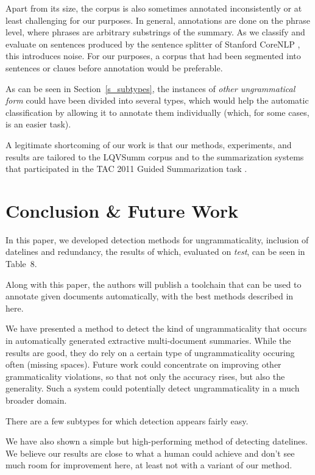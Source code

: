 \documentclass[a4paper,10pt]{scrartcl}
\theoremstyle{style}
\begin{document}
Apart from its size, the corpus is also sometimes annotated inconsistently or at least challenging for our purposes. In general, annotations are done on the phrase level, where phrases are arbitrary substrings of the summary. As we classify and evaluate on sentences produced by the sentence splitter of Stanford CoreNLP \citep{manning-EtAl:2014:P14-5}, this introduces noise. For our purposes, a corpus that had been segmented into sentences or claues before annotation would be preferable.

As can be seen in Section~\ref{s_subtypes}, the instances of \textit{other ungrammatical form} could have been divided into several types, which would help the automatic classification by allowing it to annotate them individually (which, for some cases, is an easier task).

A legitimate shortcoming of our work is that our methods, experiments, and results are tailored to the LQVSumm corpus and to the summarization systems that participated in the TAC 2011 Guided Summarization task \citep{owczarzak2011overview}.

\newpage
\section{Conclusion \& Future Work}
\label{conclusion}

In this paper, we developed detection methods for ungrammaticality, inclusion of datelines and redundancy, the results of which, evaluated on \textit{test}, can be seen in Table~8.

Along with this paper, the authors will publish a toolchain that can be used to annotate given documents automatically, with the best methods described in here.

We have presented a method to detect the kind of ungrammaticality that occurs in automatically generated extractive multi-document summaries. While the results are good, they do rely on a certain type of ungrammaticality occuring often (missing spaces). Future work could concentrate on improving other grammaticality violations, so that not only the accuracy rises, but also the generality. Such a system could potentially detect ungrammaticality in a much broader domain.

There are a few subtypes for which detection appears fairly easy.

We have also shown a simple but high-performing method of detecting datelines. We believe our results are close to what a human could achieve and don't see much room for improvement here, at least not with a variant of our method.
\end{document}
